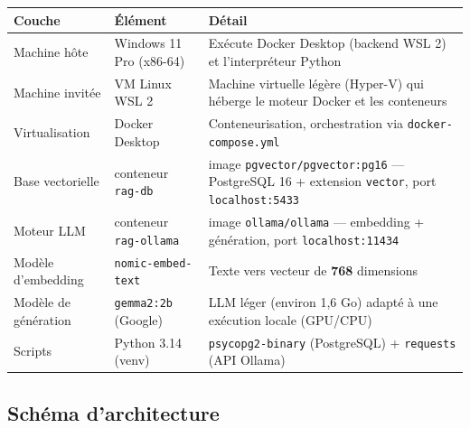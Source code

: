 \documentclass[11pt,a4paper]{article}
\begin{document}
\begin{center}
\renewcommand{\arraystretch}{1.3}
\begin{tabular}{>{\raggedright\arraybackslash}p{2.6cm} >{\raggedright\arraybackslash}p{3.6cm} >{\raggedright\arraybackslash}p{8.4cm}}
\toprule
\textbf{Couche} & \textbf{Élément} & \textbf{Détail} \\
\midrule
Machine hôte & Windows 11 Pro (x86-64) & Exécute Docker Desktop (backend WSL 2) et l'interpréteur Python \\
Machine invitée & VM Linux WSL 2 & Machine virtuelle légère (Hyper-V) qui héberge le moteur Docker et les conteneurs \\
Virtualisation & Docker Desktop & Conteneurisation, orchestration via \texttt{docker-compose.yml} \\
Base vectorielle & conteneur \texttt{rag-db} & image \texttt{pgvector/pgvector:pg16} --- PostgreSQL 16 + extension \texttt{vector}, port \texttt{localhost:5433} \\
Moteur LLM & conteneur \texttt{rag-ollama} & image \texttt{ollama/ollama} --- embedding + génération, port \texttt{localhost:11434} \\
Modèle d'embedding & \texttt{nomic-embed-text} & Texte vers vecteur de \textbf{768} dimensions \\
Modèle de génération & \texttt{gemma2:2b} (Google) & LLM léger (environ 1,6 Go) adapté à une exécution locale (GPU/CPU) \\
Scripts & Python 3.14 (venv) & \texttt{psycopg2-binary} (PostgreSQL) + \texttt{requests} (API Ollama) \\
\bottomrule
\end{tabular}
\end{center}

\subsection{Schéma d'architecture}
\end{document}
